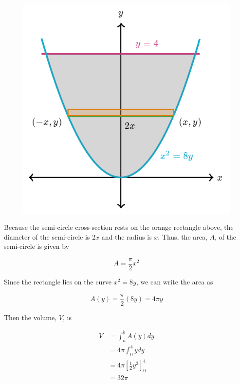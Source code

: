         \begin{figure}[hbt!]
            \centering
            \includegraphics[scale=0.75]{Resources/Unit5IntegrationApps/Volume1}
        \end{figure}

        \noindent Because the semi-circle cross-section rests on the orange rectangle above,
        the diameter of the semi-circle is $2x$ and the radius is $x$. Thus, the area, $A$,
        of the semi-circle is given by

        \begin{equation*}
            A   = \frac{\pi}{2}x^2
        \end{equation*}

        \noindent Since the rectangle lies on the curve $x^2=8y$, we can write the area as

        \begin{equation*}
            A(y)    = \frac{\pi}{2}(8y) = 4\pi y
        \end{equation*}

        \noindent Then the volume, $V$, is

        \begin{align*}
            V &= \int^b_a A(y)dy \\
            &= 4\pi \int^4_0 ydy \\
            &= 4\pi\left[\frac{1}{2}y^2\right]^4_0 \\
            &= 32 \pi
        \end{align*}



